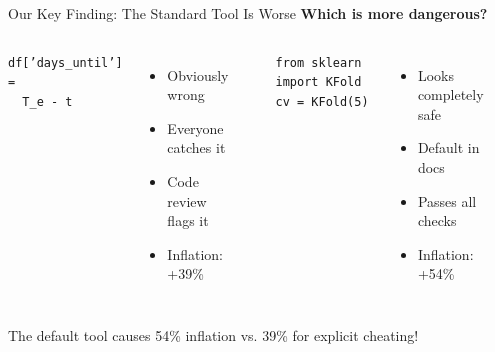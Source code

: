 \documentclass[aspectratio=169]{beamer}
\begin{document}
\begin{frame}{Our Key Finding: The Standard Tool Is Worse}
\textbf{Which is more dangerous?}

\vspace{1em}
\begin{columns}[T]

\texttt{df['days\_until'] =} \\
\texttt{~~T\_e - t}

\vspace{0.5em}
\begin{itemize}
\item Obviously wrong
\item Everyone catches it
\item Code review flags it
\item \alert{Inflation: +39\%}
\end{itemize}

\vspace{0.5em}
\begin{center}
\end{center}


\texttt{from sklearn import KFold} \\
\texttt{cv = KFold(5)}

\vspace{0.5em}
\begin{itemize}
\item Looks completely safe
\item Default in docs
\item Passes all checks
\item \alert{Inflation: +54\%}
\end{itemize}

\vspace{0.5em}
\begin{center}
\end{center}
\end{columns}

\vspace{1em}
\begin{center}
\Large
\alert{The default tool causes 54\% inflation vs. 39\% for explicit cheating!}
\end{center}
\end{frame}
\end{document}
